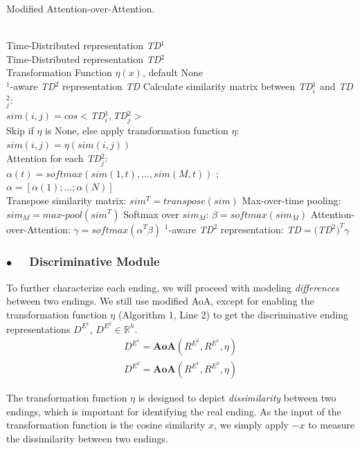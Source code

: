 \documentclass[letterpaper]{article} %
\begin{document}
\begin{algorithm}[tb]
\caption{Modified Attention-over-Attention.}
\label{alg:modified-aoa}
\begin{algorithmic}[1] %
\REQUIRE ~~\\ %
Time-Distributed representation {\em TD}$^1$ \\
Time-Distributed representation {\em TD}$^2$ \\
Transformation Function $\eta(x)$, default None \\
$^1$-aware {\em TD}$^2$ representation {\em TD}
\STATE Calculate similarity matrix between {\em TD}$^1_i$ and {\em TD}$^2_j$: \\$sim(i,j) = cos<${\em TD}$^1_i, ${\em TD}$^2_j>$ \\
\STATE Skip if $\eta$ is None, else apply transformation function $\eta$: \\$sim(i,j) = \eta(sim(i,j))$ \\
\STATE Attention for each {\em TD}$^2_j$: \\
$\alpha(t)=softmax(sim(1,t), ..., sim(M,t))$ ; \\
$\alpha = [\alpha(1); ...; \alpha(N)]$ \\
\STATE Transpose similarity matrix: $sim^T = transpose(sim)$
\STATE Max-over-time pooling: $sim_{M}=max\text{-}pool(sim^T)$	%
\STATE Softmax over $sim_{M}$: $\beta = softmax(sim_{M})$
\STATE Attention-over-Attention: $\gamma = softmax(\alpha^{T} \beta) $
$^1$-aware {\em TD}$^2$ representation: {\em TD}$ = (${\em TD}${^2})^T \gamma$
\end{algorithmic}
\end{algorithm}


\subsubsection*{$\bullet$~~ Discriminative Module}
To further characterize each ending, we will proceed with modeling {\em differences} between two endings.
We still use modified AoA, except for enabling the transformation function $\eta$ (Algorithm 1, Line 2) to get the discriminative ending representations $D^{E^1}$, $D^{E^2}\in\mathbb{R}^{h}$.
\begin{gather}
D^{E^1} = \mathbf{AoA}(R^{E^2}, R^{E^1}, \eta) \\
D^{E^2} = \mathbf{AoA}(R^{E^1}, R^{E^2}, \eta)
\end{gather}

The transformation function $\eta$ is designed to depict {\em dissimilarity} between two endings, which is important for identifying the real ending.
As the input of the transformation function is the cosine similarity $x$, we simply apply $-x$ to measure the dissimilarity between two endings.
\end{document}
